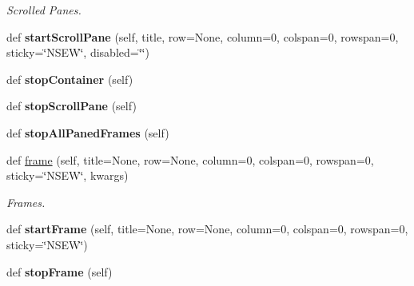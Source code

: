 \begin{DoxyCompactItemize}
\begin{DoxyCompactList}\small\item\em Scrolled Panes. \end{DoxyCompactList}\item 
\mbox{\label{class_python_01_g_u_i_1_1appjar_1_1gui_a672c29da629e6b58da2655d85a29ad7a}} 
def {\bfseries start\+Scroll\+Pane} (self, title, row=None, column=0, colspan=0, rowspan=0, sticky=\char`\"{}N\+S\+EW\char`\"{}, disabled=\char`\"{}\char`\"{})
\item 
\mbox{\label{class_python_01_g_u_i_1_1appjar_1_1gui_a9d275c7d41382b7ea5e0bae7fb5e8f23}} 
def {\bfseries stop\+Container} (self)
\item 
\mbox{\label{class_python_01_g_u_i_1_1appjar_1_1gui_a10e4c92b466de333c6e3b8c072f42801}} 
def {\bfseries stop\+Scroll\+Pane} (self)
\item 
\mbox{\label{class_python_01_g_u_i_1_1appjar_1_1gui_a9f48f63b25b6aef9efdae5ee00f823a4}} 
def {\bfseries stop\+All\+Paned\+Frames} (self)
\item 
\mbox{\label{class_python_01_g_u_i_1_1appjar_1_1gui_a221420a78d9171ce23ae876f33645603}} 
def \hyperlink{class_python_01_g_u_i_1_1appjar_1_1gui_a221420a78d9171ce23ae876f33645603}{frame} (self, title=None, row=None, column=0, colspan=0, rowspan=0, sticky=\char`\"{}N\+S\+EW\char`\"{}, kwargs)
\begin{DoxyCompactList}\small\item\em Frames. \end{DoxyCompactList}\item 
\mbox{\label{class_python_01_g_u_i_1_1appjar_1_1gui_a467674662101a6508dc84e0a51386ac4}} 
def {\bfseries start\+Frame} (self, title=None, row=None, column=0, colspan=0, rowspan=0, sticky=\char`\"{}N\+S\+EW\char`\"{})
\item 
\mbox{\label{class_python_01_g_u_i_1_1appjar_1_1gui_a9d84767739a4e30005d75f6a0d404548}} 
def {\bfseries stop\+Frame} (self)
\item 

\end{DoxyCompactItemize}
